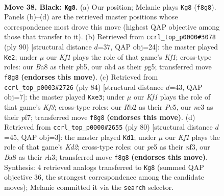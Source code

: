 \documentclass[11pt]{article}
\begin{document}
\clearpage

\begin{figure}[p]\centering
\begin{subfigure}{0.46\textwidth}\centering
\resizebox{\linewidth}{!}{%
\newchessgame
\chessboard[
  setfen={b4k2/P4p2/6p1/4P2n/6KN/R3N2P/1r6/8 b - - 12 38},
  showmover=false,
  pgfstyle=straightmove, color=movearrow, markmove={f8-g8}
]}
\caption{}
\end{subfigure}\hfill
\begin{subfigure}{0.46\textwidth}\centering
\resizebox{\linewidth}{!}{%
\newchessgame
\chessboard[
  setfen={8/5p2/n2Bn3/1p3kp1/4N3/5P1P/6P1/5K2 w - - 1 46},
  showmover=false,
  pgfstyle=straightmove, color=movearrow, markmove={f1-e2}
]}
\caption{}
\end{subfigure}
\\[4pt]
\begin{subfigure}{0.46\textwidth}\centering
\resizebox{\linewidth}{!}{%
\newchessgame
\chessboard[
  setfen={3b1nk1/5p2/1Np1p3/2P1P3/5P2/4nK2/2B5/8 w - - 0 43},
  showmover=false,
  pgfstyle=straightmove, color=movearrow, markmove={f3-e3}
]}
\caption{}
\end{subfigure}\hfill
\begin{subfigure}{0.46\textwidth}\centering
\resizebox{\linewidth}{!}{%
\newchessgame
\chessboard[
  setfen={8/5R2/2k1pp2/2Bp4/1P3P2/5n1r/2PK4/8 w - - 2 41},
  showmover=false,
  pgfstyle=straightmove, color=movearrow, markmove={d2-d1}
]}
\caption{}
\end{subfigure}
\caption{\textbf{Move 38, Black: \texttt{Kg8}.} (a) Our position; Melanie plays \texttt{Kg8} (\texttt{f8g8}). Panels (b)--(d) are the retrieved master positions whose correspondence most drove this move (highest QAP objective among those that transfer to it). (b) Retrieved from \texttt{ccrl\_top\_p0000\#3078} (ply 90) [structural distance $d$=37, QAP obj=24]: the master played \texttt{Ke2}; under $\mu$ our \emph{Kf1} plays the role of that game's \emph{Kf1}; cross-type roles: our \emph{B}a8 as their \emph{p}b5, our \emph{n}h4 as their \emph{p}g5; transferred move \texttt{f8g8} \textbf{(endorses this move)}. (c) Retrieved from \texttt{ccrl\_top\_p0003\#2726} (ply 84) [structural distance $d$=43, QAP obj=7]: the master played \texttt{Kxe3}; under $\mu$ our \emph{Kf1} plays the role of that game's \emph{Kf3}; cross-type roles: our \emph{R}b2 as their \emph{P}e5, our \emph{n}e3 as their \emph{p}f7; transferred move \texttt{f8g8} \textbf{(endorses this move)}. (d) Retrieved from \texttt{ccrl\_top\_p0000\#2655} (ply 80) [structural distance $d$=45, QAP obj=3]: the master played \texttt{Kd1}; under $\mu$ our \emph{Kf1} plays the role of that game's \emph{Kd2}; cross-type roles: our \emph{p}e5 as their \emph{n}f3, our \emph{B}a8 as their \emph{r}h3; transferred move \texttt{f8g8} \textbf{(endorses this move)}. Synthesis: 4 retrieved analogs transferred to \texttt{Kg8} (summed QAP objective 36, the strongest correspondence among the candidate moves); Melanie committed it via the \texttt{search} selector.}
\label{fig:thought-m75}
\end{figure}
\end{document}
